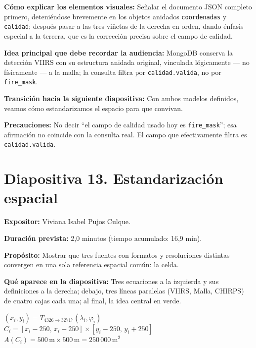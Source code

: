 \documentclass[11pt,a4paper]{article}
\newcommand{\campo}[2]{\par\medskip\noindent\textbf{#1:} #2\par}
\newcommand{\separadordiapositiva}{\bigskip\noindent{\color{Tierra!60}\hrulefill}\bigskip}
\begin{document}
\campo{C\'omo explicar los elementos visuales}{Se\~nalar el documento
JSON completo primero, deteni\'endose brevemente en los objetos
anidados \texttt{coordenadas} y \texttt{calidad}; despu\'es pasar a las
tres vi\~netas de la derecha en orden, dando \'enfasis especial a la
tercera, que es la correcci\'on precisa sobre el campo de calidad.}
\campo{Idea principal que debe recordar la audiencia}{MongoDB conserva
la detecci\'on VIIRS con su estructura anidada original, vinculada
l\'ogicamente --- no f\'isicamente --- a la malla; la consulta filtra
por \texttt{calidad.valida}, no por \texttt{fire\_mask}.}
\campo{Transici\'on hacia la siguiente diapositiva}{Con ambos modelos
definidos, veamos c\'omo estandarizamos el espacio para que convivan.}
\campo{Precauciones}{No decir ``el campo de calidad usado hoy es
\texttt{fire\_mask}''; esa afirmaci\'on no coincide con la consulta
real. El campo que efectivamente filtra es \texttt{calidad.valida}.}

\separadordiapositiva

\section*{Diapositiva 13. Estandarizaci\'on espacial}

\campo{Expositor}{Viviana Isabel Pujos Culque.}
\campo{Duraci\'on prevista}{2,0 minutos (tiempo acumulado: 16,9 min).}
\campo{Prop\'osito}{Mostrar que tres fuentes con formatos y
resoluciones distintas convergen en una sola referencia espacial
com\'un: la celda.}
\campo{Qu\'e aparece en la diapositiva}{Tres ecuaciones a la izquierda
y sus definiciones a la derecha; debajo, tres l\'ineas paralelas
(VIIRS, Malla, CHIRPS) de cuatro cajas cada una; al final, la idea
central en verde.}

\begin{center}
\small
$(x_i, y_i) = T_{4326\to32717}(\lambda_i, \varphi_i)$\\[2pt]
$C_i = [x_i{-}250,\, x_i{+}250]\times[y_i{-}250,\, y_i{+}250]$\\[2pt]
$A(C_i) = 500\,\text{m}\times500\,\text{m} = 250\,000\,\text{m}^2$
\end{center}
\end{document}
